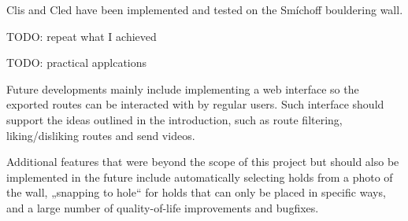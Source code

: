 
Clis and Cled have been implemented and tested on the Smíchoff bouldering wall.


TODO: repeat what I achieved

TODO: practical applcations

Future developments mainly include implementing a web interface so the exported routes can be interacted with by regular users.
Such interface should support the ideas outlined in the introduction, such as route filtering, liking/disliking routes and send videos.

Additional features that were beyond the scope of this project but should also be implemented in the future include automatically selecting holds from a photo of the wall, „snapping to hole“ for holds that can only be placed in specific ways, and a large number of quality-of-life improvements and bugfixes.
